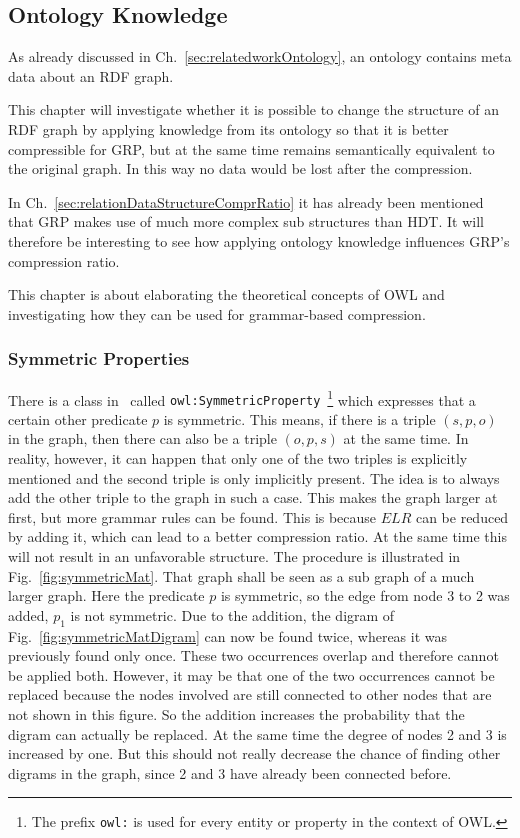 \subsection{Ontology Knowledge}\label{sec:approachOntKnowledge}

As already discussed in Ch.~\ref{sec:relatedworkOntology}, an ontology contains meta data about an RDF graph.

This chapter will investigate whether it is possible to change the structure of an RDF graph by applying knowledge from its ontology so that it is better compressible for GRP, but at the same time remains semantically equivalent to the original graph. In this way no data would be lost after the compression.

In Ch.~\ref{sec:relationDataStructureComprRatio} it has already been mentioned that GRP makes use of much more complex sub structures than HDT. It will therefore be interesting to see how applying ontology knowledge influences GRP's compression ratio.

This chapter is about elaborating the theoretical concepts of OWL and investigating how they can be used for grammar-based compression.

\subsubsection{Symmetric Properties}


There is a class in~\cite{owl} called {\tt owl:SymmetricProperty}~\footnote{The prefix {\tt owl:} is used for every entity or property in the context of OWL.} which expresses that a certain other predicate $p$ is symmetric. This means, if there is a triple $(s,p,o)$ in the graph, then there can also be a triple $(o,p,s)$ at the same time. In reality, however, it can happen that only one of the two triples is explicitly mentioned and the second triple is only implicitly present. The idea is to always add the other triple to the graph in such a case. This makes the graph larger at first, but more grammar rules can be found. This is because $ELR$ can be reduced by adding it, which can lead to a better compression ratio. At the same time this will not result in an unfavorable structure. The procedure is illustrated in Fig.~\ref{fig:symmetricMat}. That graph shall be seen as a sub graph of a much larger graph. Here the predicate $p$ is symmetric, so the edge from node 3 to 2 was added, $p_1$ is not symmetric. Due to the addition, the digram of Fig.~\ref{fig:symmetricMatDigram} can now be found twice, whereas it was previously found only once. These two occurrences overlap and therefore cannot be applied both. However, it may be that one of the two occurrences cannot be replaced because the nodes involved are still connected to other nodes that are not shown in this figure. So the addition increases the probability that the digram can actually be replaced. At the same time the degree of nodes 2 and 3 is increased by one. But this should not really decrease the chance of finding other digrams in the graph, since 2 and 3 have already been connected before.


